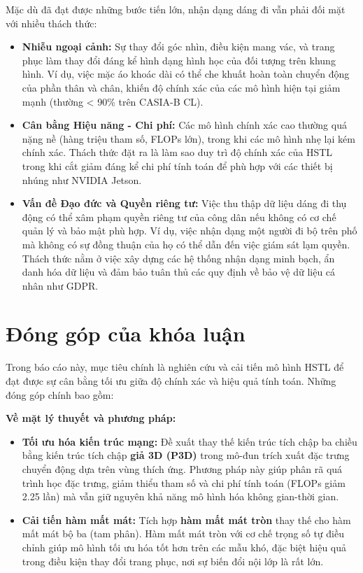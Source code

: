 Mặc dù đã đạt được những bước tiến lớn, nhận dạng dáng đi vẫn phải đối mặt với nhiều thách thức:
\begin{itemize}
    \item \textbf{Nhiễu ngoại cảnh:} Sự thay đổi góc nhìn, điều kiện mang vác, và trang phục làm thay đổi đáng kể hình dạng hình học của đối tượng trên khung hình. Ví dụ, việc mặc áo khoác dài có thể che khuất hoàn toàn chuyển động của phần thân và chân, khiến độ chính xác của các mô hình hiện tại giảm mạnh (thường < 90\% trên CASIA-B CL).
    \item \textbf{Cân bằng Hiệu năng - Chi phí:} Các mô hình chính xác cao thường quá nặng nề (hàng triệu tham số, FLOPs lớn), trong khi các mô hình nhẹ lại kém chính xác. Thách thức đặt ra là làm sao duy trì độ chính xác của HSTL trong khi cắt giảm đáng kể chi phí tính toán để phù hợp với các thiết bị nhúng như NVIDIA Jetson.
    \item \textbf{Vấn đề Đạo đức và Quyền riêng tư:} Việc thu thập dữ liệu dáng đi thụ động có thể xâm phạm quyền riêng tư của công dân \cite{shen2023comprehensivesurveydeepgait} nếu không có cơ chế quản lý và bảo mật phù hợp. Ví dụ, việc nhận dạng một người đi bộ trên phố mà không có sự đồng thuận của họ có thể dẫn đến việc giám sát lạm quyền. Thách thức nằm ở việc xây dựng các hệ thống nhận dạng minh bạch, ẩn danh hóa dữ liệu và đảm bảo tuân thủ các quy định về bảo vệ dữ liệu cá nhân như GDPR.
\end{itemize}

\section{Đóng góp của khóa luận}

Trong báo cáo này, mục tiêu chính là nghiên cứu và cải tiến mô hình HSTL để đạt được sự cân bằng tối ưu giữa độ chính xác và hiệu quả tính toán. Những đóng góp chính bao gồm:

\textbf{Về mặt lý thuyết và phương pháp:}
\begin{itemize}
    \item \textbf{Tối ưu hóa kiến trúc mạng:} Đề xuất thay thế kiến trúc tích chập ba chiều bằng kiến trúc tích chập \textbf{ giả 3D (P3D)} trong mô-đun trích xuất đặc trưng chuyển động dựa trên vùng thích ứng. Phương pháp này giúp phân rã quá trình học đặc trưng, giảm thiểu tham số và chi phí tính toán (FLOPs giảm 2.25 lần) mà vẫn giữ nguyên khả năng mô hình hóa không gian-thời gian.
    \item \textbf{Cải tiến hàm mất mát:} Tích hợp \textbf{hàm mất mát tròn} thay thế cho hàm mất mát bộ ba (tam phân). Hàm mất mát tròn với cơ chế trọng số tự điều chỉnh giúp mô hình tối ưu hóa tốt hơn trên các mẫu khó, đặc biệt hiệu quả trong điều kiện thay đổi trang phục, nơi sự biến đổi nội lớp là rất lớn.
\end{itemize}

